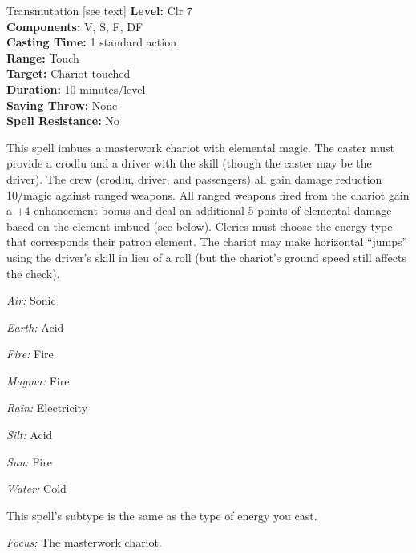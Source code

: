{Transmutation [see text]}
{
	\textbf{Level:}
	Clr 7\\
	\textbf{Components:}
	V, S, F, DF\\
	\textbf{Casting Time:}
	1 standard action\\
	\textbf{Range:}
	Touch\\
	\textbf{Target:}
	Chariot touched\\
	\textbf{Duration:}
	10 minutes/level\\
	\textbf{Saving Throw:}
	None\\
	\textbf{Spell Resistance:}
	No\\
}
{
	This spell imbues a masterwork chariot with elemental magic. The caster must provide a crodlu and a driver with the  skill (though the caster may be the driver). The crew (crodlu, driver, and passengers) all gain damage reduction 10/magic against ranged weapons. All ranged weapons fired from the chariot gain a +4 enhancement bonus and deal an additional 5 points of elemental damage based on the element imbued (see below). Clerics must choose the energy type that corresponds their patron element. The chariot may make horizontal ``jumps'' using the driver's  skill in lieu of a  roll (but the chariot's ground speed still affects the check).
	\begin{itemize*}
	\item \textit{Air:} Sonic
	\item \textit{Earth:} Acid
	\item \textit{Fire:} Fire
	\item \textit{Magma:} Fire
	\item \textit{Rain:} Electricity
	\item \textit{Silt:} Acid
	\item \textit{Sun:} Fire
	\item \textit{Water:} Cold
	\end{itemize*}

	This spell's subtype is the same as the type of energy you cast.

	\textit{Focus:} The masterwork chariot.
}

